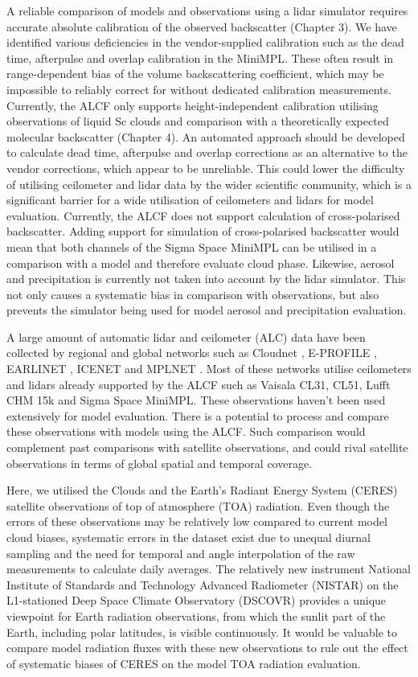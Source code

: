 A reliable comparison of models and observations using a lidar simulator
requires accurate absolute calibration of the observed backscatter
(Chapter 3). We have identified various deficiencies in the vendor-supplied
calibration such as the dead time, afterpulse and overlap calibration in
the MiniMPL. These often result in range-dependent bias of the volume
backscattering coefficient, which may be impossible to reliably correct
for without dedicated calibration measurements. Currently, the ALCF only
supports height-independent calibration utilising observations of liquid
Sc clouds and comparison with a theoretically expected
molecular backscatter (Chapter 4). An automated approach should be developed to calculate
dead time, afterpulse and overlap corrections as an alternative to the 
vendor corrections, which appear to be unreliable. This could lower the
difficulty of utilising ceilometer and lidar data by the wider scientific
community, which is a significant barrier for a wide utilisation of ceilometers
and lidars for model evaluation.
Currently, the ALCF does not support calculation of cross-polarised
backscatter. Adding support for simulation of cross-polarised backscatter
would mean that both channels of the Sigma Space MiniMPL can be utilised
in a comparison with a model and therefore evaluate cloud phase.
Likewise, aerosol and precipitation is currently not taken into account
by the lidar simulator. This not only causes a systematic bias in comparison
with observations, but also prevents the simulator being used for
model aerosol and precipitation evaluation.

A large amount of automatic lidar and ceilometer (ALC) data have been collected by regional and global
networks such as Cloudnet \citep{illingworth2007},
E-PROFILE \citep{illingworth2018}, EARLINET
\citep{pappalardo2014}, ICENET \citep{cazorla2017} and MPLNET
\citep{welton2006}. Most of these networks utilise ceilometers
and lidars already supported by the ALCF such as Vaisala CL31, CL51, Lufft CHM
15k and Sigma Space MiniMPL. These observations haven't been used
extensively for model evaluation. There is a potential to process and compare
these observations with models using the ALCF. Such comparison would complement
past comparisons with satellite observations, and could rival satellite
observations in terms of global spatial and temporal coverage. 

Here, we utilised the Clouds and the Earth's Radiant Energy System (CERES) satellite observations of top of atmosphere (TOA) radiation. Even
though the errors of these observations may be relatively low compared to 
current model cloud biases, systematic errors in the dataset exist due
to unequal diurnal sampling and the need for temporal and angle
interpolation of the raw measurements to calculate daily averages. 
The relatively new instrument National Institute of Standards and Technology
Advanced Radiometer (NISTAR) on the L1-stationed Deep Space Climate Observatory (DSCOVR)
provides a unique viewpoint for Earth radiation observations, from which 
the sunlit part of the Earth, including polar latitudes, is visible continuously.
It would be valuable to compare model radiation fluxes with these new
observations to rule out the effect of systematic biases of CERES on the
model TOA radiation evaluation.

